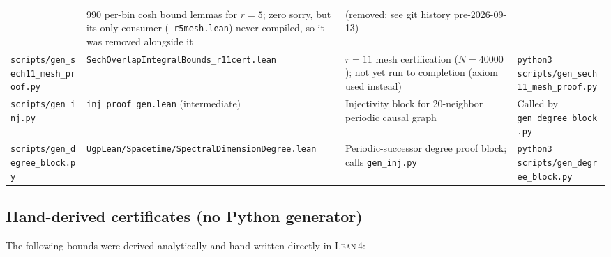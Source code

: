 \documentclass[11pt,a4paper]{article}
\theoremstyle{definition}
\newcommand{\lean}{\textsc{Lean}\,4}
\begin{document}
\begin{center}
{\begin{tabular}{llp{3.2cm}p{3.5cm}}
  & 990 per-bin cosh bound lemmas for $r{=}5$; zero sorry, but its only consumer (\texttt{\_r5mesh.lean}) never compiled, so it was removed alongside it
  & (removed; see git history pre-2026-09-13) \\[4pt]
\texttt{scripts/gen\_sech11\_mesh\_proof.py}
  & \texttt{SechOverlapIntegralBounds\_r11cert.lean}
  & $r{=}11$ mesh certification ($N{=}40000$); not yet run to completion (axiom used instead)
  & \texttt{python3 scripts/gen\_sech11\_mesh\_proof.py} \\[4pt]
\texttt{scripts/gen\_inj.py}
  & \texttt{inj\_proof\_gen.lean} (intermediate)
  & Injectivity block for 20-neighbor periodic causal graph
  & Called by \texttt{gen\_degree\_block.py} \\[4pt]
\texttt{scripts/gen\_degree\_block.py}
  & \texttt{UgpLean/Spacetime/SpectralDimensionDegree.lean}
  & Periodic-successor degree proof block; calls \texttt{gen\_inj.py}
  & \texttt{python3 scripts/gen\_degree\_block.py} \\
\bottomrule
\end{tabular}%
}%
\end{center}

\subsection*{Hand-derived certificates (no Python generator)}

The following bounds were derived analytically and hand-written directly in \lean{}:
\end{document}
